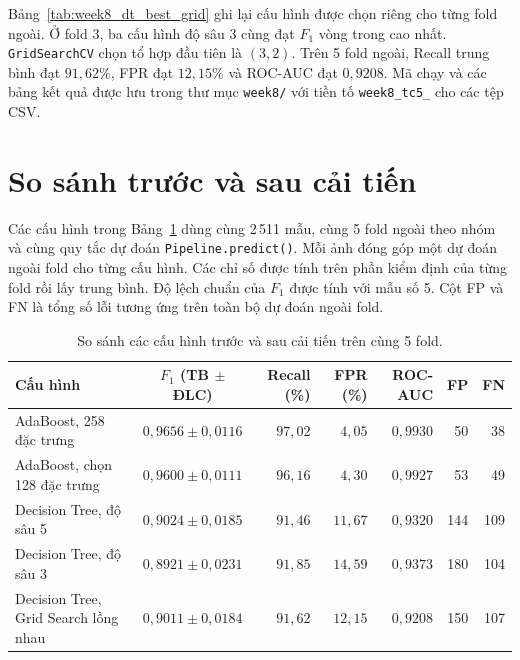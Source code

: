 \documentclass[12pt,a4paper,oneside]{report}
\begin{document}
Bảng~\ref{tab:week8_dt_best_grid} ghi lại cấu hình được chọn riêng
cho từng fold ngoài. Ở fold 3, ba cấu hình độ sâu 3 cùng đạt
$F_1$ vòng trong cao nhất. \texttt{GridSearchCV} chọn tổ hợp đầu tiên
là $(3,2)$. Trên 5 fold ngoài, Recall trung bình
đạt $91{,}62\%$, FPR đạt $12{,}15\%$ và ROC-AUC đạt $0{,}9208$.
Mã chạy và các bảng kết quả được lưu trong thư mục \texttt{week8/}
với tiền tố \texttt{week8\_tc5\_} cho các tệp CSV.

\section{So sánh trước và sau cải tiến}
\label{sec:week8_ablation}

Các cấu hình trong Bảng~\ref{tab:week8_comparison} dùng cùng
2\,511 mẫu, cùng 5 fold ngoài theo nhóm và cùng quy tắc dự đoán
\texttt{Pipeline.predict()}. Mỗi ảnh đóng góp một dự đoán ngoài fold
cho từng cấu hình. Các chỉ số được tính trên phần kiểm định của từng
fold rồi lấy trung bình. Độ lệch chuẩn của $F_1$ được tính với mẫu số 5.
Cột FP và FN là tổng số lỗi tương ứng trên toàn bộ dự đoán ngoài fold.

\begin{table}[htbp]
  \centering
  \small
  \caption{So sánh các cấu hình trước và sau cải tiến trên cùng 5 fold.}
  \label{tab:week8_comparison}
  \begin{tabularx}{\linewidth}{@{}>{\raggedright\arraybackslash}X c r r r r r@{}}
    \toprule
    \textbf{Cấu hình}
    & $F_1$ \textbf{(TB $\pm$ ĐLC)}
    & \textbf{Recall (\%)}
    & \textbf{FPR (\%)}
    & \textbf{ROC-AUC}
    & \textbf{FP}
    & \textbf{FN} \\
    \midrule
    AdaBoost, 258 đặc trưng
    & $0{,}9656 \pm 0{,}0116$ & $97{,}02$ & $4{,}05$ & $0{,}9930$ & 50 & 38 \\
    AdaBoost, chọn 128 đặc trưng
    & $0{,}9600 \pm 0{,}0111$ & $96{,}16$ & $4{,}30$ & $0{,}9927$ & 53 & 49 \\
    \addlinespace
    Decision Tree, độ sâu 5
    & $0{,}9024 \pm 0{,}0185$ & $91{,}46$ & $11{,}67$ & $0{,}9320$ & 144 & 109 \\
    Decision Tree, độ sâu 3
    & $0{,}8921 \pm 0{,}0231$ & $91{,}85$ & $14{,}59$ & $0{,}9373$ & 180 & 104 \\
    Decision Tree, Grid Search lồng nhau
    & $0{,}9011 \pm 0{,}0184$ & $91{,}62$ & $12{,}15$ & $0{,}9208$ & 150 & 107 \\
    \bottomrule
  \end{tabularx}
\end{table}
\end{document}
